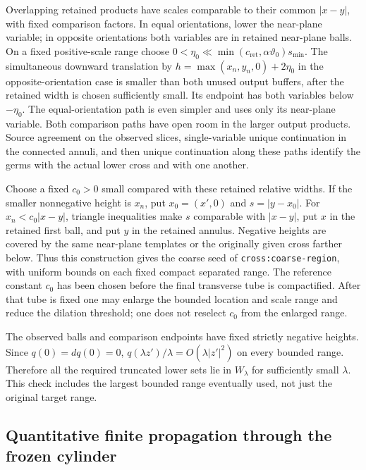 \documentclass[11pt]{article}
\theoremstyle{definition}
\theoremstyle{remark}
\numberwithin{equation}{section}
\begin{document}
Overlapping retained products have scales comparable to their common
$|x-y|$, with fixed comparison factors. In equal orientations, lower
the near-plane variable; in opposite orientations both variables are
in retained near-plane balls. On a fixed positive-scale range choose
$0<\eta_0\ll\min(c_{\mathrm{ret}},\alpha\vartheta_0)s_{\min}$. The simultaneous downward
translation by
$h=\max(x_n,y_n,0)+2\eta_0$ in the opposite-orientation case is
smaller than both unused output buffers, after the retained width is
chosen sufficiently small. Its endpoint has both variables below
$-\eta_0$. The equal-orientation path is even simpler and uses only
its near-plane variable. Both comparison paths have open room in the
larger output products. Source agreement on the observed slices,
single-variable unique continuation in the connected annuli, and then
unique continuation along these paths identify the germs with the
actual lower cross and with one another.

Choose a fixed $c_0>0$ small compared with these retained relative
widths. If the smaller nonnegative height is $x_n$, put
$x_0=(x',0)$ and $s=|y-x_0|$. For
$x_n<c_0|x-y|$, triangle inequalities make $s$ comparable with
$|x-y|$, put $x$ in the retained first ball, and put $y$ in the
retained annulus. Negative heights are covered by the same near-plane
templates or the originally given cross farther below. Thus this
construction gives the coarse seed of \texttt{cross:coarse-region},
with uniform bounds on each fixed compact separated range. The
reference constant $c_0$ has been chosen before the final transverse
tube is compactified. After that tube is fixed one may enlarge the
bounded location and scale range and reduce the dilation threshold;
one does not reselect $c_0$ from the enlarged range.

The observed balls and comparison endpoints have fixed strictly
negative heights. Since $q(0)=dq(0)=0$,
$q(\lambda z')/\lambda=O(\lambda|z'|^2)$ on every bounded range.
Therefore all the required truncated lower sets lie in $W_\lambda$
for sufficiently small $\lambda$. This check includes the largest
bounded range eventually used, not just the original target range.

\subsection{Quantitative finite propagation through the frozen cylinder}
\label{fixed-separation-supp:finite}
\end{document}
